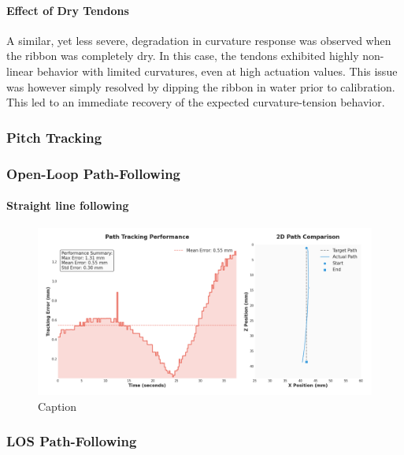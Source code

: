 \paragraph*{Effect of Dry Tendons}
A similar, yet less severe, degradation in curvature response was observed when the ribbon was completely dry. In this case, the tendons exhibited highly non-linear behavior with limited curvatures, even at high actuation values. This issue was however simply resolved by dipping the ribbon in water prior to calibration. This led to an immediate recovery of the expected curvature-tension behavior.



\subsubsection{Pitch Tracking}

\subsubsection{Open-Loop Path-Following}

\paragraph*{Straight line following}
\begin{figure} [H]
    \centering
    \includegraphics[width=\linewidth]{images/pathfollowing/openloop/straight_20250704_172708.png}
    \caption{Caption}
    \label{fig:enter-label}
\end{figure}


\subsubsection{LOS Path-Following}

